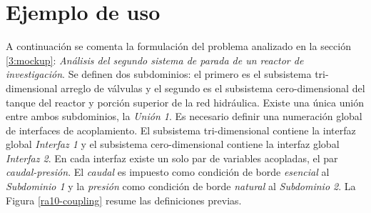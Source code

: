 \section{Ejemplo de uso}
\label{ap1:ejemplo}

A continuación se comenta la formulación del problema analizado en la sección \ref{3:mockup}:
\textit{Análisis del segundo sistema de parada de un reactor de investigación}.
Se definen dos subdominios: el primero es el subsistema tri-dimensional arreglo de válvulas y el segundo es el subsistema cero-dimensional del tanque del reactor y porción superior de la red hidráulica.
Existe una única unión entre ambos subdominios, la \textit{Unión 1}.
Es necesario definir una numeración global de interfaces de acoplamiento.
El subsistema tri-dimensional contiene la interfaz global \textit{Interfaz 1} y el subsistema cero-dimensional contiene la interfaz global \textit{Interfaz 2}.
En cada interfaz existe un solo par de variables acopladas, el par \textit{caudal-presión}.
El \textit{caudal} es impuesto como condición de borde \textit{esencial} al \textit{Subdominio 1} y la \textit{presión} como condición de borde \textit{natural} al \textit{Subdominio 2}.
La Figura \ref{ra10-coupling} resume las definiciones previas.


